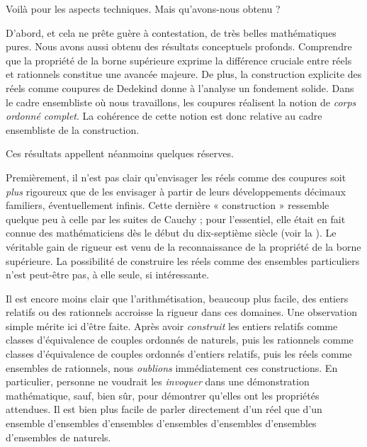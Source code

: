 \documentclass[../../../include/open-logic-section]{subfiles}
\begin{document}

Voilà pour les aspects techniques. Mais qu'avons-nous obtenu ?

D'abord, et cela ne prête guère à contestation, de très belles
mathématiques pures. Nous avons aussi obtenu des résultats conceptuels
profonds. Comprendre que la propriété de la borne supérieure exprime
la différence cruciale entre réels et rationnels constitue une avancée
majeure. De plus, la construction explicite des réels comme coupures de
Dedekind donne à l'analyse un fondement solide. Dans le cadre
ensembliste où nous travaillons, les coupures réalisent la notion
de \emph{corps ordonné complet}. La cohérence de cette notion
est donc relative au cadre ensembliste de la construction.
%
%
%
%
%

Ces résultats appellent néanmoins quelques réserves.

Premièrement, il n'est pas clair qu'envisager les réels comme des
coupures soit \emph{plus} rigoureux que de les envisager à partir de
leurs développements décimaux familiers, éventuellement infinis.
Cette dernière « construction » ressemble quelque peu à celle par
les suites de Cauchy ; pour l'essentiel, elle était en fait connue
des mathématiciens dès le début du dix-septième siècle
(voir la ). Le véritable gain de rigueur est venu de
la reconnaissance de la propriété de la borne supérieure.
La possibilité de construire les réels comme des ensembles particuliers
n'est peut-être pas, à elle seule, si intéressante.

Il est encore moins clair que l'arithmétisation, beaucoup plus facile,
des entiers relatifs ou des rationnels accroisse la rigueur dans ces
domaines. Une observation simple mérite ici d'être faite. Après avoir
\emph{construit} les entiers relatifs comme classes d'équivalence de
couples ordonnés de naturels, puis les rationnels comme classes
d'équivalence de couples ordonnés d'entiers relatifs, puis les réels
comme ensembles de rationnels, nous \emph{oublions} immédiatement
ces constructions. En particulier, personne ne voudrait les
\emph{invoquer} dans une démonstration mathématique, sauf, bien sûr,
pour démontrer qu'elles ont les propriétés attendues. Il est bien
plus facile de parler directement d'un réel que d'un ensemble
d'ensembles d'ensembles d'ensembles d'ensembles d'ensembles d'ensembles
de naturels.
%
%
%
\end{document}
